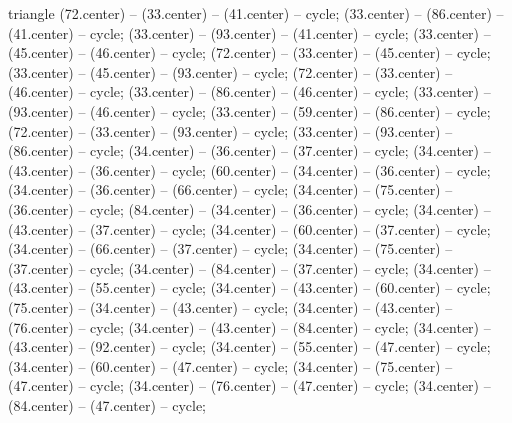 \begin{pgfonlayer}{triangle}
 (72.center) -- (33.center) -- (41.center) -- cycle; 
 (33.center) -- (86.center) -- (41.center) -- cycle; 
 (33.center) -- (93.center) -- (41.center) -- cycle; 
 (33.center) -- (45.center) -- (46.center) -- cycle; 
 (72.center) -- (33.center) -- (45.center) -- cycle; 
 (33.center) -- (45.center) -- (93.center) -- cycle; 
 (72.center) -- (33.center) -- (46.center) -- cycle; 
 (33.center) -- (86.center) -- (46.center) -- cycle; 
 (33.center) -- (93.center) -- (46.center) -- cycle; 
 (33.center) -- (59.center) -- (86.center) -- cycle; 
 (72.center) -- (33.center) -- (93.center) -- cycle; 
 (33.center) -- (93.center) -- (86.center) -- cycle; 
 (34.center) -- (36.center) -- (37.center) -- cycle; 
 (34.center) -- (43.center) -- (36.center) -- cycle; 
 (60.center) -- (34.center) -- (36.center) -- cycle; 
 (34.center) -- (36.center) -- (66.center) -- cycle; 
 (34.center) -- (75.center) -- (36.center) -- cycle; 
 (84.center) -- (34.center) -- (36.center) -- cycle; 
 (34.center) -- (43.center) -- (37.center) -- cycle; 
 (34.center) -- (60.center) -- (37.center) -- cycle; 
 (34.center) -- (66.center) -- (37.center) -- cycle; 
 (34.center) -- (75.center) -- (37.center) -- cycle; 
 (34.center) -- (84.center) -- (37.center) -- cycle; 
 (34.center) -- (43.center) -- (55.center) -- cycle; 
 (34.center) -- (43.center) -- (60.center) -- cycle; 
 (75.center) -- (34.center) -- (43.center) -- cycle; 
 (34.center) -- (43.center) -- (76.center) -- cycle; 
 (34.center) -- (43.center) -- (84.center) -- cycle; 
 (34.center) -- (43.center) -- (92.center) -- cycle; 
 (34.center) -- (55.center) -- (47.center) -- cycle; 
 (34.center) -- (60.center) -- (47.center) -- cycle; 
 (34.center) -- (75.center) -- (47.center) -- cycle; 
 (34.center) -- (76.center) -- (47.center) -- cycle; 
 (34.center) -- (84.center) -- (47.center) -- cycle; 

\end{pgfonlayer}
